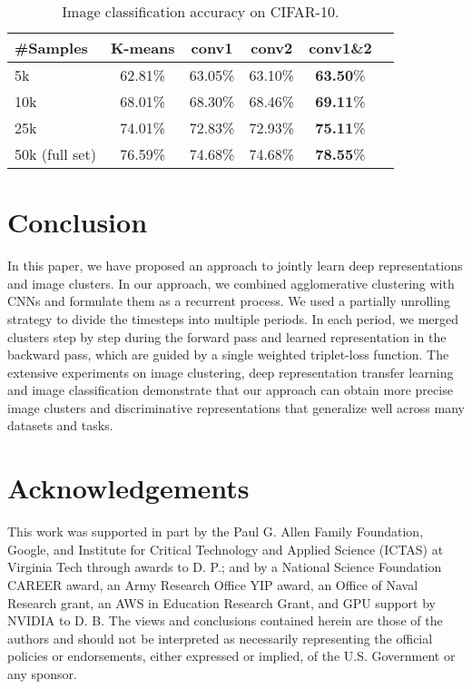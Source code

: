 \documentclass[10pt,twocolumn,letterpaper]{article}
\begin{document}
\begin{table}
\caption{{Image classification accuracy on CIFAR-10.}}
\vspace{-15pt}
\center
\small
\begin{tabular}{lccccc}
  \toprule
  \#Samples & K-means \cite{coates2011analysis} & conv1 & conv2 & conv1\&2 \\   
  \midrule
  
  5k        &62.81\% &63.05\% &63.10\% &\textbf{63.50}\%\\
  
  10k       &68.01\% &68.30\% &68.46\% &\textbf{69.11}\% \\  
  
  25k       &74.01\% &72.83\% &72.93\% &\textbf{75.11}\%\\
  
  50k (full set)&76.59\% &74.68\% &74.68\% &\textbf{78.55}\% \\
  \bottomrule
\end{tabular}
\label{TB_CIFAR10_Perf}
\end{table}



\section{Conclusion}
{In this paper, we have proposed an approach to {jointly learn deep representations and image clusters. In our approach, we combined agglomerative clustering with CNNs and formulate them as a recurrent process. We used a partially unrolling strategy to divide the timesteps into multiple periods. In each period, we merged clusters step by step during the forward pass and learned representation in the backward pass, which are guided by a single weighted triplet-loss function.} The extensive experiments on image clustering, deep representation transfer learning and image classification demonstrate that our approach can obtain more precise image clusters and discriminative representations that generalize well across many datasets and tasks.}

\section{Acknowledgements}
This work was supported in part by the Paul G. Allen Family Foundation, Google, and Institute for Critical Technology and Applied Science (ICTAS) at Virginia Tech through awards to D. P.; and by a National Science Foundation CAREER award, an Army Research Office YIP award, an Office of Naval Research grant, an AWS in Education Research Grant, and GPU support by NVIDIA to D. B. The views and conclusions contained herein are those of the authors and should not be interpreted as necessarily representing the official policies or endorsements, either expressed or implied, of the U.S. Government or any sponsor.
\end{document}
